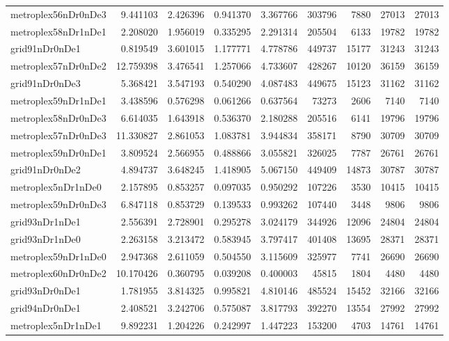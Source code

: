\begin{longtable}{|l|r|r|r|r|r|r|r|r|}
metroplex56nDr0nDe3 & 9.441103 & 2.426396 & 0.941370 & 3.367766 & 303796 & 7880 & 27013 & 27013 \\
metroplex58nDr1nDe1 & 2.208020 & 1.956019 & 0.335295 & 2.291314 & 205504 & 6133 & 19782 & 19782 \\
grid91nDr0nDe1 & 0.819549 & 3.601015 & 1.177771 & 4.778786 & 449737 & 15177 & 31243 & 31243 \\
metroplex57nDr0nDe2 & 12.759398 & 3.476541 & 1.257066 & 4.733607 & 428267 & 10120 & 36159 & 36159 \\
grid91nDr0nDe3 & 5.368421 & 3.547193 & 0.540290 & 4.087483 & 449675 & 15123 & 31162 & 31162 \\
metroplex59nDr1nDe1 & 3.438596 & 0.576298 & 0.061266 & 0.637564 & 73273 & 2606 & 7140 & 7140 \\
metroplex58nDr0nDe3 & 6.614035 & 1.643918 & 0.536370 & 2.180288 & 205516 & 6141 & 19796 & 19796 \\
metroplex57nDr0nDe3 & 11.330827 & 2.861053 & 1.083781 & 3.944834 & 358171 & 8790 & 30709 & 30709 \\
metroplex59nDr0nDe1 & 3.809524 & 2.566955 & 0.488866 & 3.055821 & 326025 & 7787 & 26761 & 26761 \\
grid91nDr0nDe2 & 4.894737 & 3.648245 & 1.418905 & 5.067150 & 449409 & 14873 & 30787 & 30787 \\
metroplex5nDr1nDe0 & 2.157895 & 0.853257 & 0.097035 & 0.950292 & 107226 & 3530 & 10415 & 10415 \\
metroplex59nDr0nDe3 & 6.847118 & 0.853729 & 0.139533 & 0.993262 & 107440 & 3448 & 9806 & 9806 \\
grid93nDr1nDe1 & 2.556391 & 2.728901 & 0.295278 & 3.024179 & 344926 & 12096 & 24804 & 24804 \\
grid93nDr1nDe0 & 2.263158 & 3.213472 & 0.583945 & 3.797417 & 401408 & 13695 & 28371 & 28371 \\
metroplex59nDr1nDe0 & 2.947368 & 2.611059 & 0.504550 & 3.115609 & 325977 & 7741 & 26690 & 26690 \\
metroplex60nDr0nDe2 & 10.170426 & 0.360795 & 0.039208 & 0.400003 & 45815 & 1804 & 4480 & 4480 \\
grid93nDr0nDe1 & 1.781955 & 3.814325 & 0.995821 & 4.810146 & 485524 & 15452 & 32166 & 32166 \\
grid94nDr0nDe1 & 2.408521 & 3.242706 & 0.575087 & 3.817793 & 392270 & 13554 & 27992 & 27992 \\
metroplex5nDr1nDe1 & 9.892231 & 1.204226 & 0.242997 & 1.447223 & 153200 & 4703 & 14761 & 14761 \\

\end{longtable}
